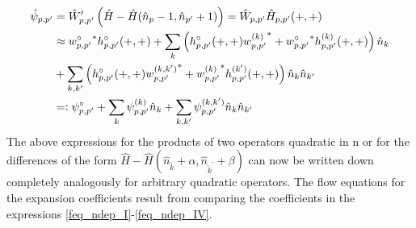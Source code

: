 \begin{appendix}
\begin{subequations}
\begin{align}
\hat\psi_{p,p^\prime}&=\hat W^\prime_{p,p^\prime} \left(\hat H - \hat H(\hat n_p-1,\hat n_{p^\prime}+1)\right)=\hat W_{p,p^\prime}\hat H_{p,p^\prime}(+,+)\nonumber\\
&\approx  {w_{p,p^\prime}^{\circ}}^*h^{\circ}_{p,p^\prime}(+,+)+\sum\limits_k \left(h^\circ_{p,p^\prime}(+,+) {w_{p,p^\prime}^{(k)}}^* + {w_{p,p^\prime}^{\circ}}^*h^{(k)}_{p,p^\prime}(+,+)\right)\hat n_k \nonumber\\
&+ \sum\limits_{k,k^\prime} \left( h^\circ_{p,p^\prime}(+,+) {w_{p,p^\prime}^{(k,k^\prime)}}^*+{w_{p,p^\prime}^{(k)}}^*h^{(k^\prime)}_{p,p^\prime}(+,+)\right)\hat n_k\hat n_{k^\prime}\nonumber\\
&=\vcentcolon {\psi_{p,p^\prime}^{\circ}} + \sum\limits_k {\psi_{p,p^\prime}^{(k)}}\hat n_k + \sum\limits_{k,k^\prime} {\psi_{p,p^\prime}^{(k,k^\prime)}}\hat n_k\hat n_ {k^\prime}
\end{align}
\end{subequations}
The above expressions for the products of two operators quadratic in n or for the differences of the form $\hat H - \hat H(\hat n_{\tilde k}+\alpha,\hat n_{\tilde k^\prime}+\beta)$
 can now be written down completely analogously for arbitrary quadratic operators. The flow equations for the expansion coefficients result from comparing the coefficients in the expressions  \ref{feq_ndep_I}-\ref{feq_ndep_IV}.

























\end{appendix}
